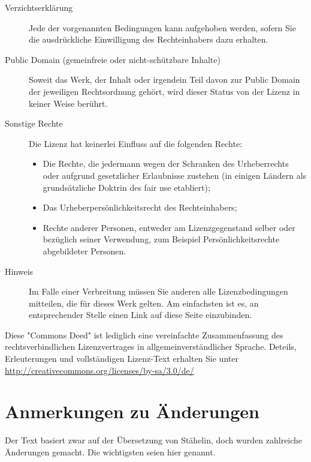 \begin{description}
    \item[Verzichtserklärung] Jede der vorgenannten Bedingungen kann aufgehoben werden, 
	  sofern Sie die ausdrückliche Einwilligung des Rechteinhabers dazu erhalten.
    \item[Public Domain (gemeinfreie oder nicht-schützbare Inhalte)] Soweit das Werk, 
	  der Inhalt oder irgendein Teil davon zur Public Domain der jeweiligen Rechtsordnung 
	  gehört, wird dieser Status von der Lizenz in keiner Weise berührt.
    \item[Sonstige Rechte] Die Lizenz hat keinerlei Einfluss auf die folgenden Rechte:
      \begin{itemize}
          \item Die Rechte, die jedermann wegen der Schranken des Urheberrechts oder 
		aufgrund gesetzlicher Erlaubnisse zustehen (in einigen Ländern als 
		grundsätzliche Doktrin des fair use etabliert);
          \item Das Urheberpersönlichkeitsrecht des Rechteinhabers;
          \item Rechte anderer Personen, entweder am Lizenzgegenstand selber oder bezüglich 
		seiner Verwendung, zum Beispiel Persönlichkeitsrechte abgebildeter Personen.
      \end{itemize}
    \item[Hinweis] Im Falle einer Verbreitung müssen Sie anderen alle Lizenzbedingungen 
	  mitteilen, die für dieses Werk gelten. Am einfachsten ist es, an entsprechender 
	  Stelle einen Link auf diese Seite einzubinden.

 \end{description}

Diese "Commons Deed" ist lediglich eine vereinfachte Zusammenfassung des rechtsverbindlichen 
Lizenzvertrages in allgemeinverständlicher Sprache. Deteils, Erleuterungen und vollständigen
Lizenz-Text erhalten Sie unter \url{http://creativecommons.org/licenses/by-sa/3.0/de/}

\section{Anmerkungen zu Änderungen}

Der Text basiert zwar auf der Übersetzung von Stähelin, doch wurden 
zahlreiche Änderungen gemacht. Die wichtigsten 
seien hier genannt.

